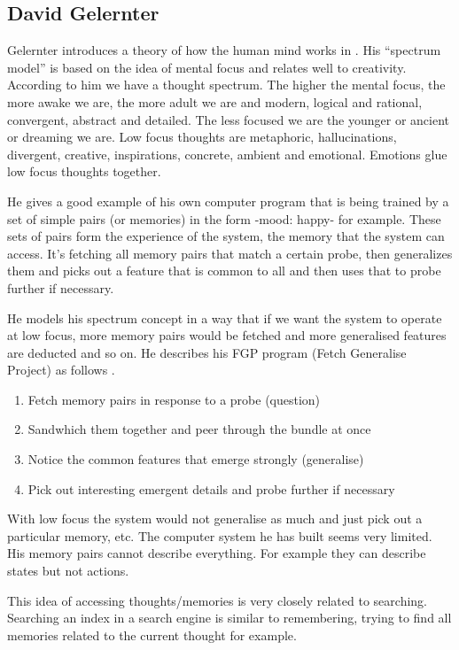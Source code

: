 \subsection{David Gelernter}

Gelernter introduces a theory of how the human mind works in \citep{Gelernter1994}. His ``spectrum model'' is based on the idea of mental focus and relates well to creativity. According to him we have a thought spectrum. The higher the mental focus, the more awake we are, the more adult we are and modern, logical and rational, convergent, abstract and detailed. The less focused we are the younger or ancient or dreaming we are. Low focus thoughts are metaphoric, hallucinations, divergent, creative, inspirations, concrete, ambient and emotional. Emotions glue low focus thoughts together.

He gives a good example of his own computer program that is being trained by a set of simple pairs (or memories) in the form -mood: happy- for example. These sets of pairs form the experience of the system, the memory that the system can access. It's fetching all memory pairs that match a certain probe, then generalizes them and picks out a feature that is common to all and then uses that to probe further if necessary.

He models his spectrum concept in a way that if we want the system to operate at low focus, more memory pairs would be fetched and more generalised features are deducted and so on. He describes his FGP program (Fetch Generalise Project) as follows \citep[p.132]{Gelernter1994}.

\begin{enumerate}
  \item Fetch memory pairs in response to a probe (question)
  \item Sandwhich them together and peer through the bundle at once
  \item Notice the common features that emerge strongly (generalise)
  \item Pick out interesting emergent details and probe further if necessary
\end{enumerate}

With low focus the system would not generalise as much and just pick out a particular memory, etc. The computer system he has built seems very limited. His memory pairs cannot describe everything. For example they can describe states but not actions.

This idea of accessing thoughts/memories is very closely related to searching. Searching an index in a search engine is similar to remembering, trying to find all memories related to the current thought for example.

